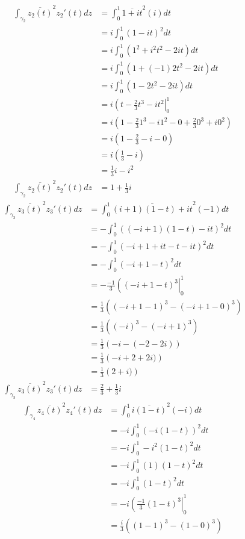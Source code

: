 \documentclass[11pt]{article}
\begin{document}
\begin{enumerate}
\begin{align*}
\int_{\gamma_2}\overline{z_2(t)}^2z_2'(t)dz &=  \int_0^1\overline{1+it}^2(i)dt\\
&= i\int_0^1(1-it)^2dt\\
&= i\int_0^1(1^2+i^2t^2-2it)dt\\
&= i\int_0^1(1+(-1)2t^2-2it)dt\\
&= i\int_0^1(1-2t^2-2it)dt\\
&= i\left(t-\frac{2}{3}t^3-it^2\right|_0^1\\
&= i\left(1-\frac{2}{3}1^3-i1^2 - 0 + \frac{2}{3}0^3 + i0^2\right)\\
&= i\left(1-\frac{2}{3}-i - 0 \right)\\
&= i\left(\frac{1}{3}-i\right)\\
&= \frac{1}{3}i-i^2\\
\int_{\gamma_2}\overline{z_2(t)}^2z_2'(t)dz &= 1+ \frac{1}{3}i
\end{align*}
\begin{align*}
\int_{\gamma_3}\overline{z_3(t)}^2z_3'(t)dz &=  \int_0^1\overline{(i+1)(1-t)+it}^2(-1)dt\\
&= -\int_0^1((-i+1)(1-t)-it)^2dt\\
&= -\int_0^1(-i+1+it-t-it)^2dt\\
&= -\int_0^1(-i+1-t)^2dt\\
&= -\frac{-1}{3}\left((-i+1-t)^3\right|_0^1\\
&= \frac{1}{3}\left((-i+1-1)^3-(-i+1-0)^3\right)\\
&= \frac{1}{3}\left((-i)^3-(-i+1)^3\right)\\
&= \frac{1}{3}\left(-i-(-2-2i)\right)\\
&= \frac{1}{3}\left(-i+2+2i)\right)\\
&= \frac{1}{3}\left(2+i)\right)\\
\int_{\gamma_3}\overline{z_3(t)}^2z_3'(t)dz &= \frac{2}{3}+\frac{1}{3}i
\end{align*}
\begin{align*}
\int_{\gamma_4}\overline{z_4(t)}^2z_4'(t)dz &=  \int_0^1\overline{i(1-t)}^2(-i)dt\\
&= -i\int_0^1(-i(1-t))^2dt\\
&= -i\int_0^1-i^2(1-t)^2dt\\
&= -i\int_0^1(1)(1-t)^2dt\\
&= -i\int_0^1(1-t)^2dt\\
&= -i\left(\frac{-1}{3}(1-t)^3\right|_0^1\\
&= \frac{i}{3}((1-1)^3-(1-0)^3)\\

\end{align*}
\end{enumerate}
\end{document}
